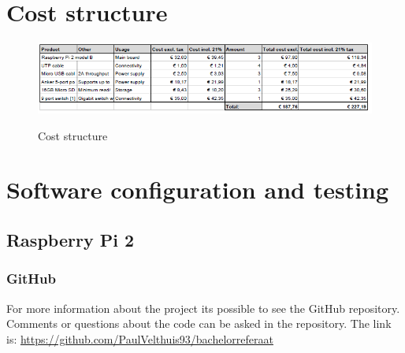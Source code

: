 \documentclass{sig-alternate-br}
\begin{document}


\appendix

\section{Cost structure}\label{sec:cost}
\begin{figure}[H]
	\includegraphics[scale=1]{cost_cluster.png}
	\label{fig:cost}
	\caption{Cost structure}
\end{figure}


\section{Software configuration and testing}\label{sec:software}

\subsection{Raspberry Pi 2}

\subsubsection{GitHub}
For more information about the project its possible to see the GitHub repository. Comments or questions about the code can be asked in the repository. \newline
The link is: \newline
\url{https://github.com/PaulVelthuis93/bachelorreferaat}
\end{document}
